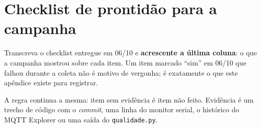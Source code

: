 \chapter{Checklist de prontidão para a campanha}
\label{ap:checklist}

\begin{orientacao}
Transcreva o checklist entregue em 06/10 e \textbf{acrescente a última
coluna}: o que a campanha mostrou sobre cada item. Um item marcado
\enquote{sim} em 06/10 que falhou durante a coleta não é motivo de
vergonha; é exatamente o que este apêndice existe para registrar.

A regra continua a mesma: item sem evidência é item não feito. Evidência
é um trecho de código com o \emph{commit}, uma linha do monitor serial,
o histórico do MQTT Explorer ou uma saída do \texttt{qualidade.py}.
\end{orientacao}

